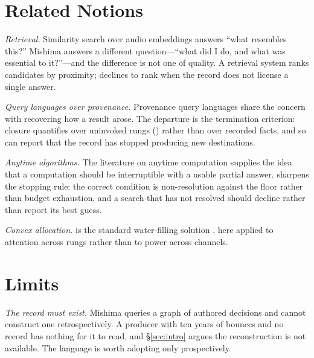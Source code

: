 \documentclass[11pt,twocolumn,a4paper]{article}
\theoremstyle{definition}
\theoremstyle{remark}
\begin{document}
\section{Related Notions}
\label{sec:related}

\emph{Retrieval.} Similarity search over audio embeddings
\citep{casey2008content} answers ``what resembles this?'' Mishima answers a
different question---``what did I do, and what was essential to it?''---and the
difference is not one of quality. A retrieval system ranks candidates by
proximity;  declines to rank when the record does not license a
single answer.

\emph{Query languages over provenance.} Provenance query languages
\citep{davidson2008provenance} share the concern with recovering how a result
arose. The departure is the termination criterion: closure quantifies over
uninvoked rungs () rather than over recorded facts, and so can
report that the record has stopped producing new destinations.

\emph{Anytime algorithms.} The literature on anytime computation
\citep{zilberstein1996using} supplies the idea that a computation should be
interruptible with a usable partial answer.  sharpens the
stopping rule: the correct condition is non-resolution against the floor rather
than budget exhaustion, and a search that has not resolved should decline rather
than report its best guess.

\emph{Convex allocation.}  is the standard water-filling
solution \citep{boyd2004convex}, here applied to attention across rungs rather
than to power across channels.

\section{Limits}
\label{sec:limits}

\emph{The record must exist.} Mishima queries a graph of authored decisions and
cannot construct one retrospectively. A producer with ten years of bounces and no
record has nothing for it to read, and \S\ref{sec:intro} argues the reconstruction
is not available. The language is worth adopting only prospectively.
\end{document}
